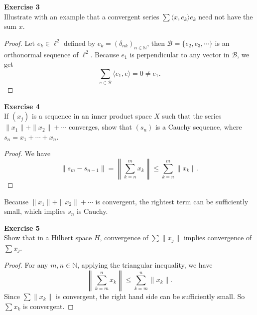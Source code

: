 \documentclass[12pt, a4paper]{article}
\theoremstyle{plain}
\newcommand{\N}{\mathbb{N}}
\newcommand{\B}{\mathscr{B}}
\newenvironment{exercise}[2][Exercise]
    { \begin{mdframed}[backgroundcolor=gray!20] \textbf{#1 #2} \\}
    {  \end{mdframed}}
\begin{document}
\pagebreak

\begin{exercise}{3}
Illustrate with an example that a convergent series $\sum \langle{x,e_k}\rangle e_k$ need not have the sum $x$.
\end{exercise}
	\begin{proof}
	Let $e_k\in \ell^2$ defined by $e_k=(\delta_{nk})_{n\in\N}$, then $\B=\{e_2,e_3,\cdots\}$ is an orthonormal sequence of $\ell^2$. Because $e_1$ is perpendicular to any vector in $\B$, we get
	\[
	\sum_{e\in \B}{\langle{e_1,e}\rangle} = 0\neq e_1.
	\]
	\end{proof}

\begin{exercise}{4}
If $(x_j)$ is a sequence in an inner product space $X$ such that the series $\|x_1\|+\|x_2\|+\cdots$ converges, show that $(s_n)$ is a Cauchy sequence, where $s_n=x_1+\cdots+x_n$.
\end{exercise}
	\begin{proof}
	We have
	\[
	\|s_m-s_{n-1}\|=\left\|\sum_{k=n}^{m}{x_k}\right\| \leq \sum_{k=n}^{m}{\|x_k\|}.
	\]
	\end{proof}
	Because $\|x_1\|+\|x_2\|+\cdots$ is convergent, the rightest term can be sufficiently small, which implies $s_n$ is Cauchy.

\begin{exercise}{5}
Show that in a Hilbert space $H$, convergence of $\sum\|x_j\|$ implies convergence of $\sum x_j$.
\end{exercise}
	\begin{proof}
	For any $m,n\in \N$, applying the triangular inequality, we have
	\[
	\left\|\sum_{k=m}^{n}{x_k}\right\| \leq \sum_{k=m}^{n}{\|x_k\|}.
	\]
	Since $\sum\|x_k\|$ is convergent, the right hand side can be sufficiently small. So $\sum x_k$ is convergent.
	\end{proof}
\end{document}
